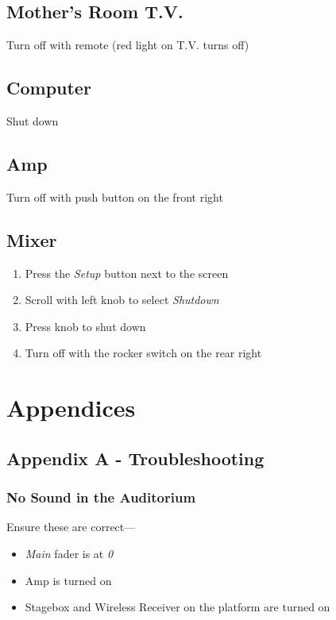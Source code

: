 \documentclass[12pt]{article}
\begin{document}
    \subsection{Mother's Room T.V.}
        Turn off with remote (red light on T.V. turns off)
    \subsection{Computer}
        Shut down
    \subsection{Amp}
        Turn off with push button on the front right
    \subsection{Mixer}
    \begin{enumerate}
        \item Press the \emph{Setup} button next to the screen
        \item Scroll with left knob to select \emph{Shutdown}
        \item Press knob to shut down
        \item Turn off with the rocker switch on the rear right
    \end{enumerate}


\section{Appendices}

    \subsection{Appendix A - Troubleshooting}

        \subsubsection{No Sound in the Auditorium}
        Ensure these are correct---
        \begin{itemize}
            \item \emph{Main} fader is at \emph{0}
            \item Amp is turned on
            \item Stagebox and Wireless Receiver on the platform are turned on
        \end{itemize}
\end{document}
